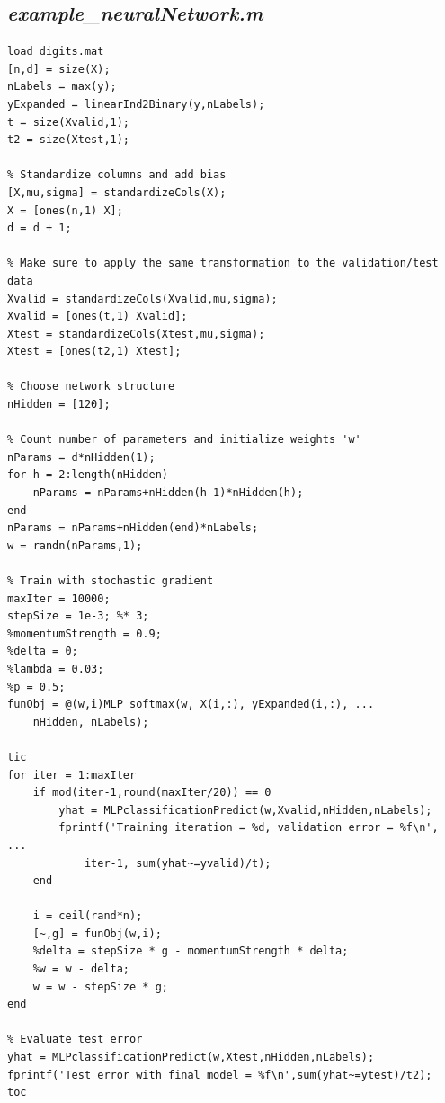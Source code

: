 \documentclass{article}
\begin{document}
\subsection{\emph{example\_neuralNetwork.m}}
\begin{lstlisting}
load digits.mat
[n,d] = size(X);
nLabels = max(y);
yExpanded = linearInd2Binary(y,nLabels);
t = size(Xvalid,1);
t2 = size(Xtest,1);

% Standardize columns and add bias
[X,mu,sigma] = standardizeCols(X);
X = [ones(n,1) X];
d = d + 1;

% Make sure to apply the same transformation to the validation/test data
Xvalid = standardizeCols(Xvalid,mu,sigma);
Xvalid = [ones(t,1) Xvalid];
Xtest = standardizeCols(Xtest,mu,sigma);
Xtest = [ones(t2,1) Xtest];

% Choose network structure
nHidden = [120];

% Count number of parameters and initialize weights 'w'
nParams = d*nHidden(1);
for h = 2:length(nHidden)
    nParams = nParams+nHidden(h-1)*nHidden(h);
end
nParams = nParams+nHidden(end)*nLabels;
w = randn(nParams,1);

% Train with stochastic gradient
maxIter = 10000;
stepSize = 1e-3; %* 3;
%momentumStrength = 0.9;
%delta = 0;
%lambda = 0.03;
%p = 0.5;
funObj = @(w,i)MLP_softmax(w, X(i,:), yExpanded(i,:), ...
    nHidden, nLabels);

tic
for iter = 1:maxIter
    if mod(iter-1,round(maxIter/20)) == 0
        yhat = MLPclassificationPredict(w,Xvalid,nHidden,nLabels);
        fprintf('Training iteration = %d, validation error = %f\n', ...
            iter-1, sum(yhat~=yvalid)/t);
    end
    
    i = ceil(rand*n);
    [~,g] = funObj(w,i);
    %delta = stepSize * g - momentumStrength * delta;
    %w = w - delta;
    w = w - stepSize * g;
end

% Evaluate test error
yhat = MLPclassificationPredict(w,Xtest,nHidden,nLabels);
fprintf('Test error with final model = %f\n',sum(yhat~=ytest)/t2);
toc
\end{lstlisting}
\end{document}
